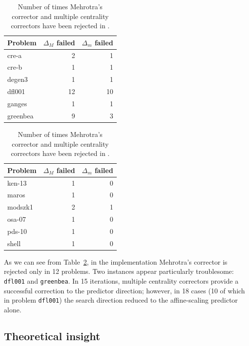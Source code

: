 \begin{table}[ht]
  \centering
  \begin{minipage}[t]{0.45\textwidth}
    \begin{tabular}{|l|r|r|}\hline
      Problem  & $\Delta_M$ failed & $\Delta_m$ failed \\ \hline
      cre-a    &  2  &  1 \\
      cre-b    &  1  &  1 \\
      degen3   &  1  &  1 \\ 
      dfl001   & 12  & 10 \\
      ganges   &  1  &  1 \\
      greenbea &  9  &  3 \\ \hline
    \end{tabular}
  \end{minipage} \hspace{1em}
  \begin{minipage}[t]{0.45\textwidth}
    \begin{tabular}{|l|r|r|}\hline
      Problem  & $\Delta_M$ failed & $\Delta_m$ failed \\ \hline
      ken-13   &  1  &  0 \\
      maros    &  1  &  0 \\
      modszk1  &  2  &  1 \\
      osa-07   &  1  &  0 \\
      pds-10   &  1  &  0 \\
      shell    &  1  &  0 \\ \hline
    \end{tabular}
  \end{minipage}
  \caption{Number of times Mehrotra's corrector and
           multiple centrality correctors have been rejected in \HOPDM.}
  \label{table:MehrotraFailure}
\end{table}

As we can see from Table~\ref{table:MehrotraFailure}, in the
\HOPDM implementation Mehrotra's corrector is rejected only in
12 problems. Two instances appear particularly troublesome:
{\tt dfl001} and {\tt greenbea}.
In 15 iterations, multiple centrality correctors provide a
successful correction to the predictor direction;
however, in 18 cases (10 of which in problem {\tt dfl001})
the search direction reduced to the affine-scaling predictor alone.

%
%
\subsection{Theoretical insight}

